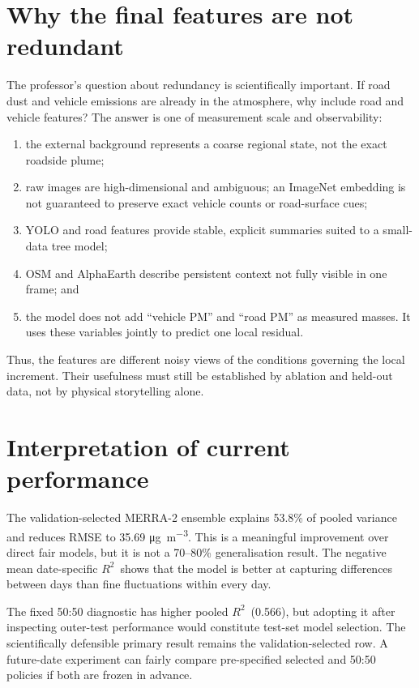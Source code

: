 \documentclass[11pt,a4paper,oneside]{report}
\newcommand{\ugm}{\si{\micro\gram\per\cubic\metre}}
\newcommand{\Rtwo}{$R^2$}
\begin{document}
\section{Why the final features are not redundant}
The professor's question about redundancy is scientifically important. If road
dust and vehicle emissions are already in the atmosphere, why include road and
vehicle features? The answer is one of measurement scale and observability:
\begin{enumerate}
  \item the external background represents a coarse regional state, not the
        exact roadside plume;
  \item raw images are high-dimensional and ambiguous; an ImageNet embedding is
        not guaranteed to preserve exact vehicle counts or road-surface cues;
  \item YOLO and road features provide stable, explicit summaries suited to a
        small-data tree model;
  \item OSM and AlphaEarth describe persistent context not fully visible in one
        frame; and
  \item the model does not add ``vehicle PM'' and ``road PM'' as measured
        masses. It uses these variables jointly to predict one local residual.
\end{enumerate}
Thus, the features are different noisy views of the conditions governing the
local increment. Their usefulness must still be established by ablation and
held-out data, not by physical storytelling alone.

\section{Interpretation of current performance}
The validation-selected MERRA-2 ensemble explains 53.8\% of pooled variance and
reduces RMSE to 35.69 \ugm. This is a meaningful improvement over direct fair
models, but it is not a 70--80\% generalisation result. The negative mean
date-specific \Rtwo\ shows that the model is better at capturing differences
between days than fine fluctuations within every day.

The fixed 50:50 diagnostic has higher pooled \Rtwo\ (0.566), but adopting it
after inspecting outer-test performance would constitute test-set model
selection. The scientifically defensible primary result remains the
validation-selected row. A future-date experiment can fairly compare
pre-specified selected and 50:50 policies if both are frozen in advance.
\end{document}
